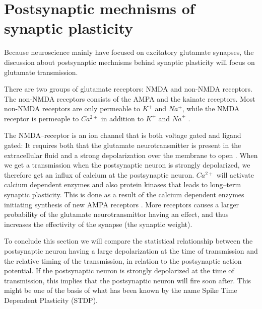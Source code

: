 \section{Postsynaptic mechnisms of synaptic plasticity}
Because neuroscience mainly have focused on excitatory glutamate synapses, the discussion about postsynaptic mechnisms behind synaptic plasticity will focus on glutamate transmission.

There are two groups of glutamate receptors: NMDA and non-NMDA receptors. 
The non-NMDA receptors consists of the AMPA and the kainate receptors. 
Most non-NMDA receptors are only permeable to $K^+$ and $Na^+$, while the NMDA receptor is permeaple to $Ca^{2+}$ in addition to $K^+$ and ${Na}^+$ \cite{PrinciplesOfNeuralScience4edKAP12}. 


The NMDA--receptor is an ion channel that is both voltage gated and ligand gated: 
	It requires both that the glutamate neurotransmitter is present in the extracellular fluid and a strong depolarization over the membrane to open \cite{PrinciplesOfNeuralScience4edKAP12}. 
When we get a transmission when the postsynaptic neuron is strongly depolarized, we therefore get an influx of calcium at the postsynaptic neuron.
$Ca^{2+}$ will activate calcium dependent enzymes and also protein kinases that leads to long--term synaptic plasticity\cite{PrinciplesOfNeuralScience4edKAP12}.
This is done as a result of the calcium dependent enzymes initiating synthesis of new AMPA receptors \cite{AMPARtrafficingArtikkel}. 
More receptors causes a larger probability of the glutamate neurotransmittor having an effect, and thus increases the effectivity of the synapse (the synaptic weight).

To conclude this section we will compare the statistical relationship between the postsynaptic neuron having a large depolarization at the time of transmission and the relative timing of the transmission, 
	in relation to the postsynaptic action potential. 
If the postsynaptic neuron is strongly depolarized at the time of transmission, this implies that the postsynaptic neuron will fire soon after.
This might be one of the basis of what has been known by the name Spike Time Dependent Plasticity (STDP).

